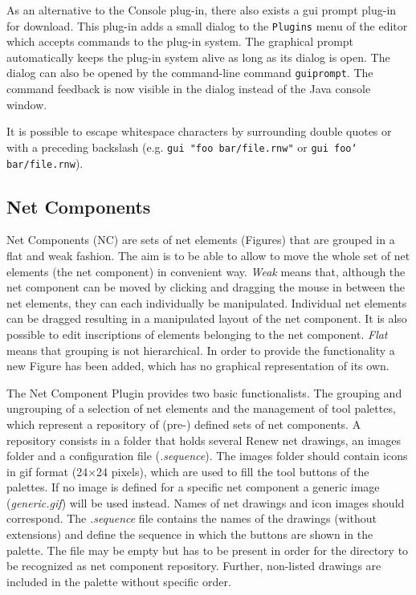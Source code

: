 As an alternative to the Console plug-in, there also exists a
gui prompt plug-in for download.
This plug-in adds a small dialog to the \texttt{Plugins} menu of
the editor which accepts commands to the plug-in system.
The graphical prompt automatically keeps the plug-in system alive as long
as its dialog is open.
The dialog can also be opened by the command-line command
\texttt{guiprompt}.
The command feedback is now visible in the dialog instead of the Java
console window.

It is possible to escape whitespace characters by surrounding double quotes 
or with a preceding backslash (e.g. \texttt{gui "foo bar/file.rnw"} or  
\texttt{gui foo\char`\\{} bar/file.rnw}).

\subsection{Net Components}
\label{sec:net-components}

Net Components (NC) are sets of net elements (Figures) that are
grouped in a flat and weak fashion.
%
The aim is to be able to allow to move the whole set of net elements
(the net component) in convenient way.
%
\emph{Weak} means that, although the net component can be moved by
clicking and dragging the mouse in between the net elements, they can
each individually be manipulated. Individual net elements can be
dragged resulting in a manipulated layout of the net component. It is
also possible to edit inscriptions of elements belonging to the net
component.
%
\emph{Flat} means that grouping is not hierarchical.  
%
In order to provide the functionality a new Figure has been added,
which has no graphical representation of its own.

The Net Component Plugin provides two basic functionalists. 
%
The grouping and ungrouping of a selection of net elements and the
management of tool palettes, which represent a repository of (pre-)
defined sets of net components.
%
A repository consists in a folder that holds several Renew net
drawings, an images folder and a configuration file (\emph{.sequence}).
%
The images folder should contain icons in gif format (24$\times$24
pixels), which are used to fill the tool buttons of the palettes.
%
If no image is defined for a specific net component a generic image
(\emph{generic.gif}) will be used instead.
%
Names of net drawings and icon images should correspond.
%
The \emph{.sequence} file contains the names of the drawings (without
extensions) and define the sequence in which the buttons are shown in
the palette.
%
The file may be empty but has to be present in order for the directory
to be recognized as net component repository.
%
Further, non-listed drawings are included in the palette without
specific order.

